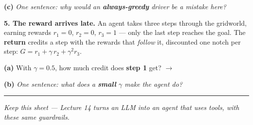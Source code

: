 \documentclass[11pt]{article}
\newif\ifsolution
\newcommand{\blk}[1]{\underline{\hspace{#1}}}
\newcommand{\rb}[2]{\ifsolution\textbf{#1}\else\blk{#2}\fi}
\newcommand{\keybox}[1]{\ifsolution\par\vspace{2pt}%
  \fbox{\parbox{0.965\textwidth}{\small\textbf{Answer.}\; #1}}\par\fi}
\newcommand{\work}[1]{\ifsolution\else\vspace{#1}\fi}
\begin{document}
\textbf{(c)} \emph{One sentence: why would an \textbf{always-greedy} driver be a mistake here?}

\work{0.8cm}
\ifsolution\else\blk{\linewidth}\fi

\keybox{(a) \textbf{A}: its average is $180/30 = \mathbf{6.0}$ against B's $8/2 = \mathbf{4.0}$, and
``greedy'' means \emph{highest average so far}. (b) $P(B) = \varepsilon/K = 0.2/2 = \mathbf{0.10}$ ---
about 1 cycle in 10. (Not $0.2$: that is the chance of exploring \emph{at all}, and half those draws land
back on A.) (c) Any equivalent of: \textbf{B has only been driven twice}, so its $4.0$ is nearly meaningless
--- two bad days of traffic would produce it --- and an always-greedy driver would take A forever and never
collect the evidence that would settle which route is faster.}

\vspace{4pt}

\textbf{5. The reward arrives late.}\; {\small An agent takes three steps through the gridworld, earning rewards
$r_1 = 0$, $r_2 = 0$, $r_3 = 1$ --- only the last step reaches the goal. The \textbf{return} credits a step
with the rewards that \emph{follow} it, discounted one notch per step:
$G = r_1 + \gamma\, r_2 + \gamma^2 r_3$.}

\vspace{3pt}
\textbf{(a)} With $\gamma = 0.5$, how much credit does \textbf{step 1} get? $\rightarrow$\
\rb{$0 + 0.5{\times}0 + 0.25{\times}1 = 0.25$}{6cm}
\work{0.3cm}

\textbf{(b)} \emph{One sentence: what does a \textbf{small} $\gamma$ make the agent do?}

\work{0.8cm}
\ifsolution\else\blk{\linewidth}\fi

\keybox{(a) $G = 0 + 0.5{\times}0 + 0.5^2{\times}1 = 0.25 \times 1 = \mathbf{0.25}$ (compare $\gamma = 0.9$,
worked in class, which gives $0.9^2 = \mathbf{0.81}$). (b) A small $\gamma$ makes the agent \textbf{myopic}
--- it heavily discounts anything more than a step or two away, so it chases immediate reward and barely
credits the early moves that set up a late win. For a long episode --- a method development, or a game of Go
--- you want $\gamma$ near 1.}

\vspace{4pt}
\vspace{4pt}\hrule\vspace{3pt}
{\small\itshape \ifsolution Answer key.\else Keep this sheet --- Lecture 14 turns an LLM into an agent that
uses tools, with these same guardrails.\fi}
\end{document}
